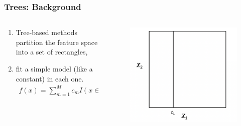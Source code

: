 \documentclass[
  shownotes,
  xcolor={svgnames},
  hyperref={colorlinks,citecolor=DarkBlue,linkcolor=DarkRed,urlcolor=DarkBlue}
  , aspectratio=169]{beamer}
\begin{document}
\begin{frame}[fragile]
\frametitle{Trees: Background}


\begin{columns}[T] %
\begin{column}{.42\textwidth}
  
\begin{enumerate}
\item Tree-based methods partition the feature space into a set of rectangles,
\item  fit a simple model (like a constant) in each one. 
\begin{align}
f(x) = \sum_{m=1}^M c_m I(x\in R_m)
\end{align}
\end{enumerate}


\end{column}  
\hfill
\begin{column}{.48\textwidth}

 \begin{figure}[H] \centering
            \captionsetup{justification=centering}
              \includegraphics[scale=0.4]{figures/cart_2}                           
 \end{figure}

\end{column}
\end{columns}

\end{frame}
\end{document}
